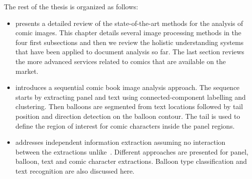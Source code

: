 The rest of the thesis is organized as follows:
\begin{itemize}
\item {} presents a detailed review of the state-of-the-art methods for the analysis of comic images. This chapter details several image processing methods in the four first subsections and then we review the holistic understanding systems that have been applied to document analysis so far.
The last section reviews the more advanced services related to comics that are available on the market.

\item {} introduces a sequential comic book image analysis approach.
The sequence starts by extracting panel and text using connected-component labelling and clustering.
Then balloons are segmented from text locations followed by tail position and direction detection on the balloon contour.
The tail is used to define the region of interest for comic characters inside the panel regions.

\item {} addresses independent information extraction assuming no interaction between the extractions unlike~.
Different approaches are presented for panel, balloon, text and comic character extractions.
Balloon type classification and text recognition are also discussed here.




\end{itemize}
